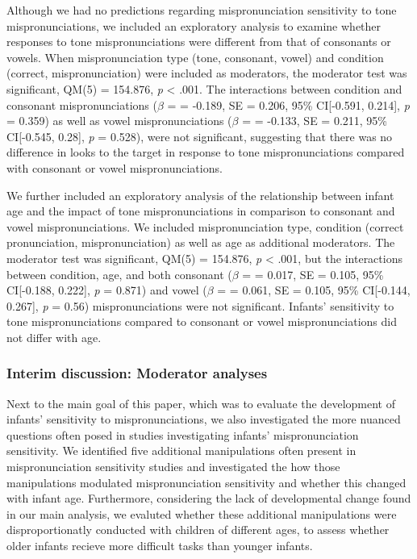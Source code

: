 \documentclass[man]{apa6}
\theoremstyle{definition}
\theoremstyle{definition}
\theoremstyle{definition}
\theoremstyle{remark}
\begin{document}
Although we had no predictions regarding mispronunciation sensitivity to
tone mispronunciations, we included an exploratory analysis to examine
whether responses to tone mispronunciations were different from that of
consonants or vowels. When mispronunciation type (tone, consonant,
vowel) and condition (correct, mispronunciation) were included as
moderators, the moderator test was significant, QM(5) = 154.876,
\emph{p} \textless{} .001. The interactions between condition and
consonant mispronunciations (\(\beta\) = = -0.189, SE = 0.206, 95\%
CI{[}-0.591, 0.214{]}, \emph{p} = 0.359) as well as vowel
mispronunciations (\(\beta\) = = -0.133, SE = 0.211, 95\% CI{[}-0.545,
0.28{]}, \emph{p} = 0.528), were not significant, suggesting that there
was no difference in looks to the target in response to tone
mispronunciations compared with consonant or vowel mispronunciations.

We further included an exploratory analysis of the relationship between
infant age and the impact of tone mispronunciations in comparison to
consonant and vowel mispronunciations. We included mispronunciation
type, condition (correct pronunciation, mispronunciation) as well as age
as additional moderators. The moderator test was significant, QM(5) =
154.876, \emph{p} \textless{} .001, but the interactions between
condition, age, and both consonant (\(\beta\) = = 0.017, SE = 0.105,
95\% CI{[}-0.188, 0.222{]}, \emph{p} = 0.871) and vowel (\(\beta\) = =
0.061, SE = 0.105, 95\% CI{[}-0.144, 0.267{]}, \emph{p} = 0.56)
mispronunciations were not significant. Infants' sensitivity to tone
mispronunciations compared to consonant or vowel mispronunciations did
not differ with age.

\subsubsection{Interim discussion: Moderator
analyses}\label{interim-discussion-moderator-analyses}

Next to the main goal of this paper, which was to evaluate the
development of infants' sensitivity to mispronunciations, we also
investigated the more nuanced questions often posed in studies
investigating infants' mispronunciation sensitivity. We identified five
additional manipulations often present in mispronunciation sensitivity
studies and investigated the how those manipulations modulated
mispronunciation sensitivity and whether this changed with infant age.
Furthermore, considering the lack of developmental change found in our
main analysis, we evaluted whether these additional manipulations were
disproportionatly conducted with children of different ages, to assess
whether older infants recieve more difficult tasks than younger infants.
\end{document}
